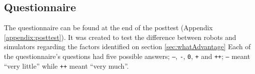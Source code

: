 \subsection{Questionnaire}
The questionnaire can be found at the end of the posttest (Appendix \ref{appendix:posttest}). It was created to test the difference between robots and simulators regarding the factors identified on section \ref{sec:whatAdvantage} Each of the questionnaire's questions had five possible answers; \texttt{--}, \texttt{-}, \texttt{0}, \texttt{+} and \texttt{++}; \texttt{--} meant ``very little'' while \texttt{++} meant ``very much''.